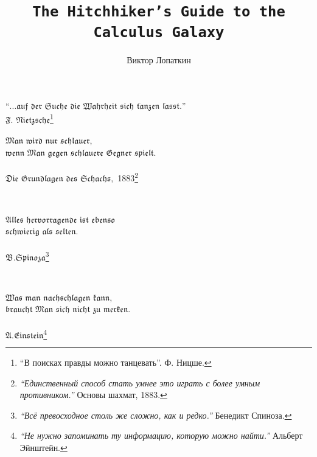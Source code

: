 \documentclass[12pt,a5paper, twoside,reqno, openany]{book}
\title{\Huge{\texttt{The Hitchhiker's Guide to the Calculus Galaxy}}}
\author{Виктор Лопаткин}
\numberwithin{equation}{section}
\theoremstyle{definition}
\begin{document}
\maketitle


\begin{flushright}
 {\Large ``$\mathfrak{...auf}$ $\mathfrak{der}$ $\mathfrak{Suche}$ $\mathfrak{die}$ $\mathfrak{Wahrheit}$ $\mathfrak{sich}$ $\mathfrak{t\ddot{a}nzen}$ $\mathfrak{l\ddot{a}sst}.$''}\\ {\small $\mathfrak{F.}$ $\mathfrak{Nietzsche}$}\footnote{``В поисках правды можно танцевать''. Ф. Ницше.}
\end{flushright}


\begin{flushright}
{\Large{$\mathfrak{Man}$ $\mathfrak{wird}$ $\mathfrak{nur}$ $\mathfrak{schlauer,}$\\$\mathfrak{wenn}$ $\mathfrak{Man}$ $\mathfrak{gegen}$ $\mathfrak{schlauere}$ $\mathfrak{Gegner}$ $\mathfrak{spielt.}$}} \\
~\\
{$\mathfrak{Die}$ $\mathfrak{Grundlagen}$ $\mathfrak{des}$ $\mathfrak{Schachs,}$ {1883}}\footnote{{\textit{``Единственный способ стать умнее это играть с более умным противником.''}} \small{Основы шахмат, 1883.}}
\end{flushright}

~\\

\begin{flushright}
{\Large{$\mathfrak{Alles}$ $\mathfrak{hervorragende}$ $\mathfrak{ist}$ $\mathfrak{ebenso}$\\$\mathfrak{schwierig}$ $\mathfrak{als}$ $\mathfrak{selten.}$}} \\
~\\
{$\mathfrak{B. Spinoza}$}\footnote{{\textit{``Всё превосходное столь же сложно, как и редко.''}} \small{Бенедикт Спиноза.}}
\end{flushright}

~\\

\begin{flushright}
{\Large{$\mathfrak{Was}$ $\mathfrak{man}$ $\mathfrak{nachschlagen}$ $\mathfrak{kann,}$\\$\mathfrak{braucht}$ $\mathfrak{Man}$ $\mathfrak{sich}$ $\mathfrak{nicht}$ $\mathfrak{zu}$ $\mathfrak{merken.}$}} \\
~\\
{$\mathfrak{A. Einstein}$}\footnote{{\textit{``Не нужно запоминать ту информацию, которую можно найти.''}} \small{Альберт Эйнштейн.}}
\end{flushright}
\end{document}

